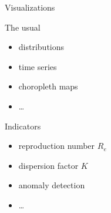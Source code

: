 \documentclass[
  8pt,
  ignorenonframetext,
]{beamer}
\providecommand{\tightlist}{%
  \setlength{\itemsep}{0pt}\setlength{\parskip}{0pt}}
\begin{document}
\begin{frame}{Visualizations}
\protect\hypertarget{visualizations}{}
\begin{block}{The usual}
\protect\hypertarget{the-usual}{}
\vspace{0.5cm}

\begin{itemize}
\tightlist
\item
  distributions
\item
  time series
\item
  choropleth maps
\item
  \ldots{}
\end{itemize}

\vspace{1cm}
\end{block}

\begin{block}{Indicators}
\protect\hypertarget{indicators}{}
\vspace{0.5cm}

\begin{itemize}
\tightlist
\item
  reproduction number \(R_e\)
\item
  dispersion factor \(K\)
\item
  anomaly detection
\item
  \ldots{}
\end{itemize}
\end{block}
\end{frame}
\end{document}
